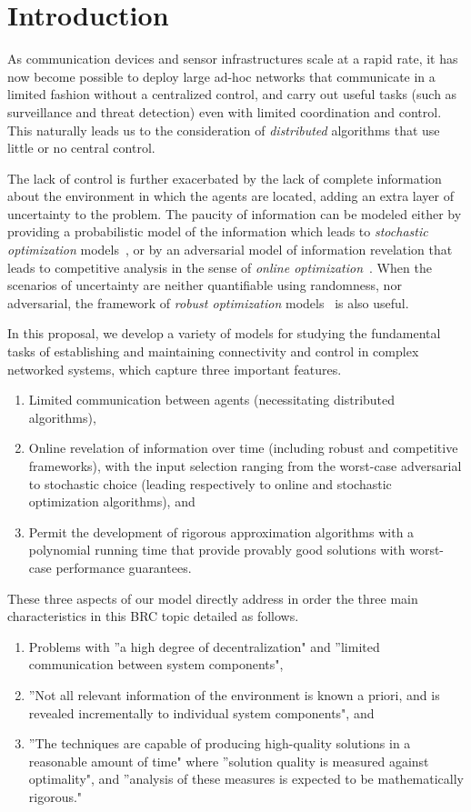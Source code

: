 \section{Introduction}

As communication devices and sensor infrastructures scale at a rapid
rate, it has now become possible to deploy large ad-hoc networks that
communicate in a limited fashion without a centralized control, and
carry out useful tasks (such as surveillance and threat detection)
even with limited coordination and control. This naturally leads us to
the consideration of {\em distributed} algorithms that use little or
no central control.

The lack of control is further exacerbated by the lack of complete
information about the environment in which the agents are located,
adding an extra layer of uncertainty to the problem. The paucity of
information can be modeled either by providing a probabilistic model
of the information which leads to {\em stochastic optimization}
models~\cite{bl97,rs06}, or by an adversarial model of information
revelation that leads to competitive analysis in the sense of {\em online
optimization}~\cite{be98,gkr10}. When the scenarios of uncertainty are neither quantifiable using randomness, nor adversarial, the framework of {\em robust optimization} models~\cite{BEN09,dgrs05} is also useful.

In this proposal, we develop a variety of models for studying the
fundamental tasks of establishing and maintaining connectivity and
control in complex networked systems, which capture three important features.

\begin{enumerate}
\item Limited
communication between agents (necessitating distributed algorithms),
\item Online revelation of information over time (including robust
and competitive frameworks), with the input selection ranging from the
worst-case adversarial to stochastic choice (leading respectively to online and stochastic optimization algorithms), and 
\item Permit the development of
rigorous approximation algorithms with a polynomial running time that
provide provably good solutions with worst-case performance guarantees. 
\end{enumerate}

These three aspects of our model directly address in order the three main
characteristics in this BRC topic detailed as follows.
\begin{enumerate}
\item Problems with ''a high degree of decentralization" and ''limited communication between system components",
\item ''Not all relevant information of the
environment is known a priori, and is revealed incrementally to individual system
components", and 
\item ''The techniques are capable of producing high-quality solutions in a reasonable amount of time" where ''solution quality is measured against optimality", and ''analysis of these measures is expected to be mathematically rigorous."
\end{enumerate}

